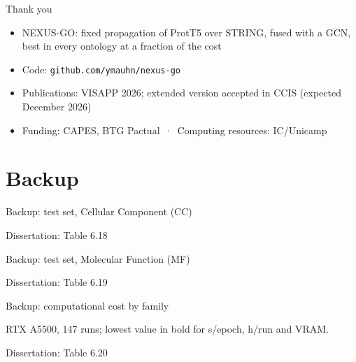 \documentclass[aspectratio=169,10pt]{beamer}
\newcommand{\src}[1]{\par\vfill\hfill{\scriptsize\color{gray}Dissertation: #1}}
\begin{document}
\begin{frame}{Thank you}
  \begin{itemize}
    \item NEXUS-GO: fixed propagation of ProtT5 over STRING, fused with a GCN, best in every ontology at a fraction of the cost
    \item Code: \texttt{github.com/ymauhn/nexus-go}
    \item Publications: VISAPP 2026; extended version accepted in CCIS (expected December 2026)
    \item Funding: CAPES, BTG Pactual \,·\, Computing resources: IC/Unicamp
  \end{itemize}
  \vspace{1.5em}
\end{frame}

\appendix
\section*{Backup}

\begin{frame}{Backup: test set, Cellular Component (CC)}
  \begin{center}\scriptsize\TabTestCC\end{center}
  \src{Table 6.18}
\end{frame}

\begin{frame}{Backup: test set, Molecular Function (MF)}
  \begin{center}\scriptsize\TabTestMF\end{center}
  \src{Table 6.19}
\end{frame}

\begin{frame}{Backup: computational cost by family}
  \begin{center}\scriptsize\TabCost\end{center}
  {\scriptsize RTX A5500, 147 runs; lowest value in bold for s/epoch, h/run and VRAM.}
  \src{Table 6.20}
\end{frame}
\end{document}

